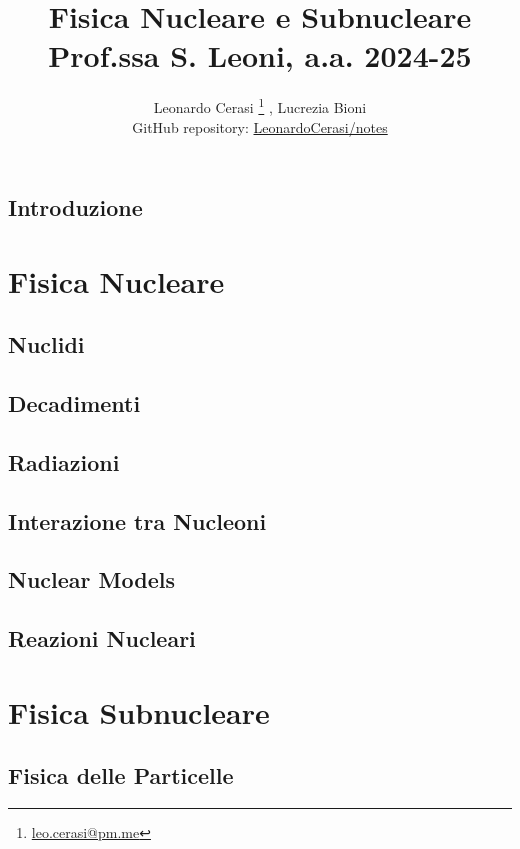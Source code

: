 \documentclass[a4paper, 12pt, openany]{book}
\author{Leonardo Cerasi%
	\thanks{\scriptsize\href{mailto:leonardo.cerasi@studenti.unimi.it}{leo.cerasi@pm.me}}%
	, Lucrezia Bioni\\
	\small GitHub repository: \href{https://github.com/LeonardoCerasi/notes}{LeonardoCerasi/notes}}
\title{\Huge\textbf{Fisica Nucleare e Subnucleare} \\ \large Prof.ssa S. Leoni, a.a. 2024-25}
\begin{document}
\frontmatter

\maketitle

\tableofcontents
\pagestyle{indice}

\mainmatter

\chapter*{Introduzione}
\pagestyle{introd}


\part{Fisica Nucleare}
\pagestyle{body}

\chapter{Nuclidi}
\pagestyle{body}


\chapter{Decadimenti}
\pagestyle{body}


\chapter{Radiazioni}
\pagestyle{body}


\chapter{Interazione tra Nucleoni}
\pagestyle{body}


\chapter{Nuclear Models}
\pagestyle{body}


\chapter{Reazioni Nucleari}
\pagestyle{body}


\part{Fisica Subnucleare}
\pagestyle{body}

\chapter{Fisica delle Particelle}

\end{document}

